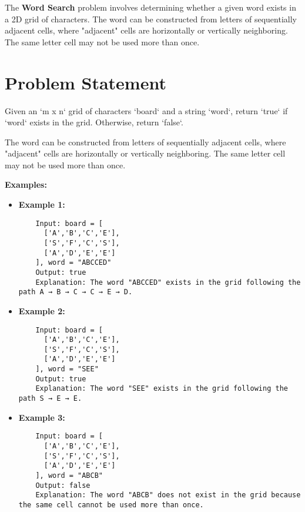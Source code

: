 
\label{chap:word_search}

The \textbf{Word Search} problem involves determining whether a given word exists in a 2D grid of characters. The word can be constructed from letters of sequentially adjacent cells, where "adjacent" cells are horizontally or vertically neighboring. The same letter cell may not be used more than once.

\section*{Problem Statement}

Given an `m x n` grid of characters `board` and a string `word`, return `true` if `word` exists in the grid. Otherwise, return `false`.

The word can be constructed from letters of sequentially adjacent cells, where "adjacent" cells are horizontally or vertically neighboring. The same letter cell may not be used more than once.

\textbf{Examples:}

\begin{itemize}
    \item \textbf{Example 1:}
    \begin{verbatim}
    Input: board = [
      ['A','B','C','E'],
      ['S','F','C','S'],
      ['A','D','E','E']
    ], word = "ABCCED"
    Output: true
    Explanation: The word "ABCCED" exists in the grid following the path A → B → C → C → E → D.
    \end{verbatim}

    \item \textbf{Example 2:}
    \begin{verbatim}
    Input: board = [
      ['A','B','C','E'],
      ['S','F','C','S'],
      ['A','D','E','E']
    ], word = "SEE"
    Output: true
    Explanation: The word "SEE" exists in the grid following the path S → E → E.
    \end{verbatim}

    \item \textbf{Example 3:}
    \begin{verbatim}
    Input: board = [
      ['A','B','C','E'],
      ['S','F','C','S'],
      ['A','D','E','E']
    ], word = "ABCB"
    Output: false
    Explanation: The word "ABCB" does not exist in the grid because the same cell cannot be used more than once.
    \end{verbatim}
\end{itemize}

